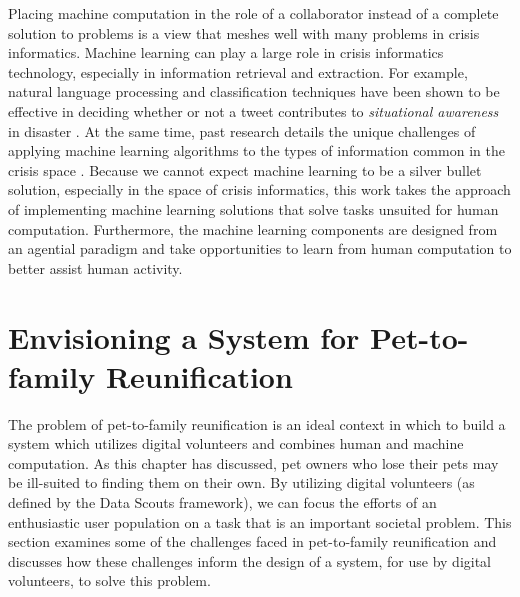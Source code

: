 Placing machine computation in the role of a collaborator instead of a complete solution to problems is a view that meshes well with many problems in crisis informatics.  Machine learning can play a large role in crisis informatics technology, especially in information retrieval and extraction.  For example, natural language processing and classification techniques have been shown to be effective in deciding whether or not a tweet contributes to {\em situational awareness} in disaster \cite{verma:nlp}.  At the same time, past research details the unique challenges of applying machine learning algorithms to the types of information common in the crisis space \cite{corvey:nlp, starbird:voluntweeters}.  Because we cannot expect machine learning to be a silver bullet solution, especially in the space of crisis informatics, this work takes the approach of implementing machine learning solutions that solve tasks unsuited for human computation.  Furthermore, the machine learning components are designed from an agential paradigm and take opportunities to learn from human computation to better assist human activity.

\section {Envisioning a System for Pet-to-family Reunification}

The problem of pet-to-family reunification is an ideal context in which to build a system which utilizes digital volunteers and combines human and machine computation.  As this chapter has discussed, pet owners who lose their pets may be ill-suited to finding them on their own.  By utilizing digital volunteers (as defined by the Data Scouts framework), we can focus the efforts of an enthusiastic user population on a task that is an important societal problem.  This section examines some of the challenges faced in pet-to-family reunification and discusses how these challenges inform the design of a system, for use by digital volunteers, to solve this problem.


